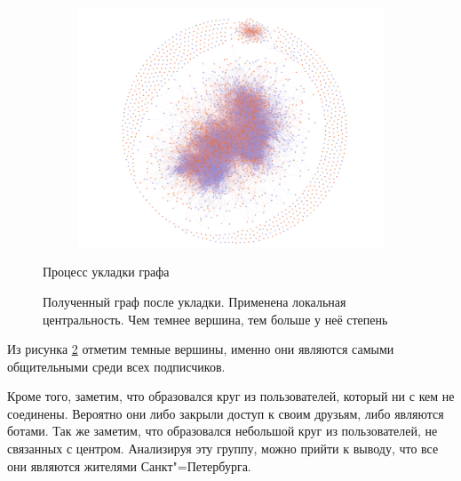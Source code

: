 \begin{figure}[H]
\begin{subfigure}[b]{0.3\textwidth}
        \includegraphics[width = \textwidth]{pictures/Layout_3.png}
    \end{subfigure}
    \caption{Процесс укладки графа}
    \label{fig:graph_layout}
\end{figure}

\begin{figure}[H]
    \centering
    
    \caption{Полученный граф после укладки. Применена локальная центральность. Чем темнее вершина, тем больше у неё степень}
    \label{fig:graph_deg}
\end{figure}

Из рисунка \ref{fig:graph_deg} отметим темные вершины, именно они являются самыми общительными среди всех подписчиков.

Кроме того, заметим, что образовался круг из пользователей, который ни с кем не соединены. Вероятно они либо закрыли доступ к своим друзьям, либо являются ботами. Так же заметим, что образовался небольшой круг из пользователей, не связанных с центром. Анализируя эту группу, можно прийти к выводу, что все они являются жителями Санкт"=Петербурга.
%     

